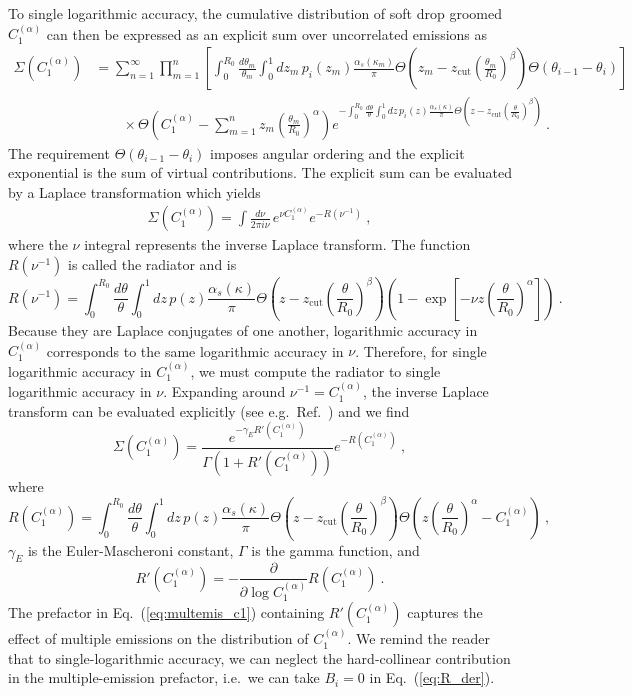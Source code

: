 \documentclass[letterpaper,11pt]{article}
\newcommand{\C}[2]{C^{(#2)}_{#1}}
\newcommand{\zcut}{z_\text{cut}}
\newcommand{\ea}{{\C{1}{\alpha}}}
\DeclareRobustCommand{\Eq}[1]{Eq.~(\ref{#1})}
\DeclareRobustCommand{\Ref}[1]{Ref.~\cite{#1}}
\begin{document}
To single logarithmic accuracy, the cumulative distribution of soft drop groomed $\ea$ can then be expressed as an explicit sum over uncorrelated emissions as 
\begin{align}
\Sigma(\ea)&= \sum_{n=1}^\infty \prod_{m=1}^n\left[ \int_0^{R_0} \frac{d\theta_m}{\theta_m}\int_0^1 dz_m \, p_i(z_m) \frac{\alpha_s(\kappa_m)}{\pi} \Theta\left(
z_m-\zcut\left(\frac{\theta_m}{R_0}\right)^\beta
\right)\Theta\left(
\theta_{i-1}-\theta_i
\right)\right]\nonumber \\
&\qquad\times\Theta\left(
\ea - \sum_{m=1}^n z_m \left(\frac{\theta_m}{R_0}\right)^\alpha
\right)e^{-\int_0^{R_0} \frac{d\theta}{\theta}\int_0^1 dz \, p_i(z) \frac{\alpha_s(\kappa)}{\pi} \Theta\left(
z-\zcut\left(\frac{\theta}{R_0}\right)^\beta
\right)} \ .
\end{align}
The requirement $\Theta\left(\theta_{i-1}-\theta_i\right)$ imposes angular ordering and the explicit exponential is the sum of virtual contributions.  The explicit sum can be evaluated by a Laplace transformation which yields
\begin{align}
\Sigma(\ea) = \int \frac{d\nu}{2\pi i \nu} \, e^{\nu \ea} e^{-R\left(\nu^{-1}\right) } \ ,
\end{align}
where the $\nu$ integral represents the inverse Laplace transform.  The function $R(\nu^{-1})$ is called the radiator and is
\begin{equation}
R\left(\nu^{-1}\right) = \int_0^{R_0} \frac{d\theta}{\theta}\int_0^1 dz\, p(z)\frac{\alpha_s(\kappa)}{\pi}\Theta\left(
z-\zcut\left(\frac{\theta}{R_0}\right)^\beta
\right)\left( 1-\exp\left[-\nu z\left( \frac{\theta}{R_0}  \right)^\alpha\right]  \right) \ .
\end{equation}
Because they are Laplace conjugates of one another, logarithmic accuracy in $\ea$ corresponds to the same logarithmic accuracy in $\nu$.  Therefore, for single logarithmic accuracy in $\ea$, we must compute the radiator to single logarithmic accuracy in $\nu$.  Expanding around $\nu^{-1}=\ea$, the inverse Laplace transform can be evaluated explicitly (see e.g.~\Ref{Catani:1992ua,Dokshitzer:1998kz,caesar}) and we find  
\begin{equation}\label{eq:multemis_c1}
\Sigma(\ea) = \frac{e^{-\gamma_E R'(\ea)}}{\Gamma\left(1+R'(\ea)\right)}e^{-R(\ea)} \ ,
\end{equation}
where 
\begin{equation} \label{eq:radiatorC1}
R(\ea) = \int_0^{R_0} \frac{d\theta}{\theta}\int_0^1 dz\, p(z)\frac{\alpha_s(\kappa)}{\pi}\Theta\left(
z-\zcut\left(\frac{\theta}{R_0}\right)^\beta
\right)\Theta\left(z\left( \frac{\theta}{R_0} \right)^\alpha-\ea \right)  \ ,
\end{equation}
$\gamma_E$ is the Euler-Mascheroni constant, $\Gamma$ is the gamma function, and
\begin{equation} \label{eq:R_der}
R'(\ea) = -\frac{\partial}{\partial \log \ea} R(\ea) \ .
\end{equation}
The prefactor in \Eq{eq:multemis_c1} containing $R'(\ea)$ captures the effect of multiple emissions on the distribution of $\ea$. We remind the reader that to single-logarithmic accuracy, we can neglect the hard-collinear contribution in the multiple-emission prefactor, i.e.\ we can take $B_i = 0$ in \Eq{eq:R_der}.
\end{document}
